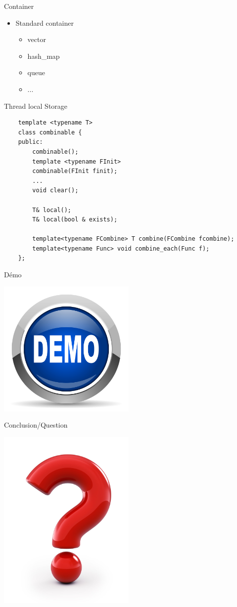 \documentclass[11pt]{beamer}
\begin{document}
\begin{frame}{Container}
	\begin{itemize}
		\item Standard container
		\begin{itemize}
			\item vector
			\item hash\_map
			\item queue
			\item ...
		\end{itemize}
	\end{itemize}
\end{frame}

\begin{frame}[fragile]{Thread local Storage}
\lstset{style=customcpp}
\lstset{language=C++}
\begin{lstlisting}
    template <typename T>
    class combinable {
    public:
        combinable();
        template <typename FInit>
        combinable(FInit finit);     
        ...
        void clear();
 
        T& local();
        T& local(bool & exists);
 
        template<typename FCombine> T combine(FCombine fcombine);
        template<typename Func> void combine_each(Func f);
    };
\end{lstlisting}
\end{frame}

\begin{frame}{Démo}
\begin{center}
\includegraphics[width=0.5\textwidth]{bluedemobutton}
\end{center}
\end{frame}

\begin{frame}{Conclusion/Question}
\begin{center}
	\includegraphics[width=0.5\textwidth]{question}
\end{center}
\end{frame}
\end{document}
